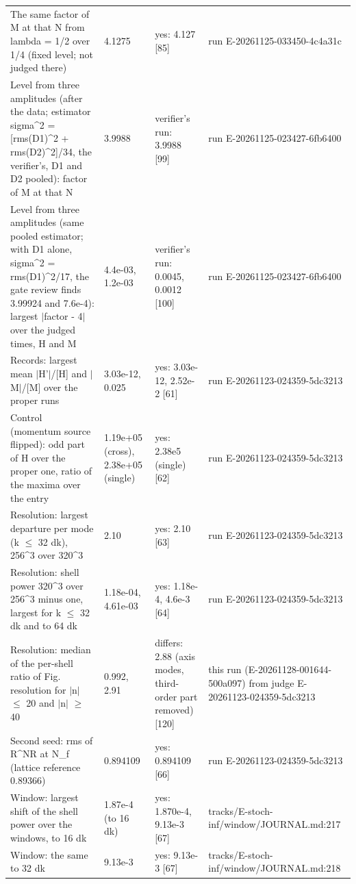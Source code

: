 \begin{table}
\begin{tabular}{p{}p{}p{}p{}}
The same factor of M at that N from lambda = 1/\allowbreak{}2 over 1/\allowbreak{}4 (fixed level; not judged there) & 4.1275 & yes: 4.127 [85] & run E-20261125-033450-4c4a31c \\
Level from three amplitudes (after the data; estimator sigma\^{}2 = [rms(D1)\^{}2 + rms(D2)\^{}2]/\allowbreak{}34, the verifier's, D1 and D2 pooled): factor of M at that N & 3.9988 & verifier's run: 3.9988 [99] & run E-20261125-023427-6fb6400 \\
Level from three amplitudes (same pooled estimator; with D1 alone, sigma\^{}2 = rms(D1)\^{}2/\allowbreak{}17, the gate review finds 3.99924 and 7.6e-4): largest $|$factor - 4$|$ over the judged times, H and M & 4.4e-03, 1.2e-03 & verifier's run: 0.0045, 0.0012 [100] & run E-20261125-023427-6fb6400 \\
Records: largest mean $|$H'$|$/\allowbreak{}[H] and $|$M$|$/\allowbreak{}[M] over the proper runs & 3.03e-12, 0.025 & yes: 3.03e-12, 2.52e-2 [61] & run E-20261123-024359-5dc3213 \\
Control (momentum source flipped): odd part of H over the proper one, ratio of the maxima over the entry & 1.19e+05 (cross), 2.38e+05 (single) & yes: 2.38e5 (single) [62] & run E-20261123-024359-5dc3213 \\
Resolution: largest departure per mode (k $\le$ 32 dk), 256\^{}3 over 320\^{}3 & 2.10 & yes: 2.10 [63] & run E-20261123-024359-5dc3213 \\
Resolution: shell power 320\^{}3 over 256\^{}3 minus one, largest for k $\le$ 32 dk and to 64 dk & 1.18e-04, 4.61e-03 & yes: 1.18e-4, 4.6e-3 [64] & run E-20261123-024359-5dc3213 \\
Resolution: median of the per-shell ratio of Fig. resolution for $|$n$|$ $\le$ 20 and $|$n$|$ $\ge$ 40 & 0.992, 2.91 & differs: 2.88 (axis modes, third-order part removed) [120] & this run (E-20261128-001644-500a097) from judge E-20261123-024359-5dc3213 \\
Second seed: rms of R\^{}NR at N\_f (lattice reference 0.89366) & 0.894109 & yes: 0.894109 [66] & run E-20261123-024359-5dc3213 \\
Window: largest shift of the shell power over the windows, to 16 dk & 1.87e-4 (to 16 dk) & yes: 1.870e-4, 9.13e-3 [67] & tracks/\allowbreak{}E-stoch-inf/\allowbreak{}window/\allowbreak{}JOURNAL.md:217 \\
Window: the same to 32 dk & 9.13e-3 & yes: 9.13e-3 [67] & tracks/\allowbreak{}E-stoch-inf/\allowbreak{}window/\allowbreak{}JOURNAL.md:218 \\

\end{tabular}
\end{table}

